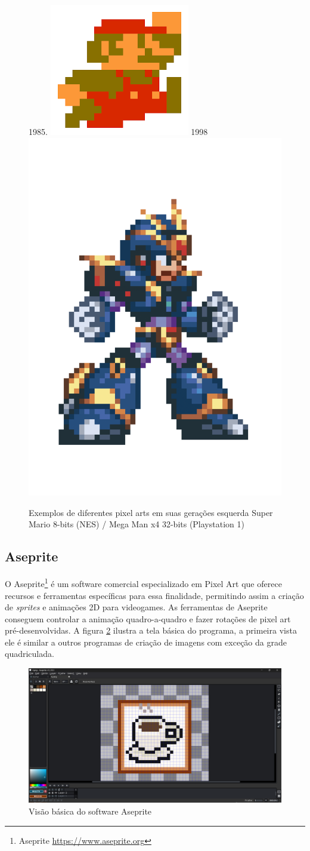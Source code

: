 \begin{figure}[ht!]
    \label{fig:comparative-8bit-32-bit-pixel-art}
    \subfloat\label{fig:mario}1985.{
        \includegraphics[width=0.35\linewidth]{figuras/mario-sprite-nes.png}
    }\hfill
    \subfloat\label{fig:mega_man}1998{
        \includegraphics[width=0.3\linewidth]{figuras/mega-man-ps1.png}
    }
    \caption{Exemplos de diferentes pixel arts em suas gerações esquerda Super Mario 8-bits (NES) /  Mega Man x4 32-bits (Playstation 1)}
\end{figure}

\subsection{Aseprite}  
\label{sec:aseprite}
O Aseprite\footnote{Aseprite \url{https://www.aseprite.org}} é um software comercial especializado em Pixel Art que oferece recursos e ferramentas específicas para essa finalidade, permitindo assim a criação de \textit{sprites} e animações 2D para videogames. As ferramentas de Aseprite conseguem controlar a animação quadro-a-quadro e fazer rotações de pixel art pré-desenvolvidas.
A figura \ref{fig:aseprite} ilustra a tela básica do programa, a primeira vista ele é similar a outros programas de criação de imagens com exceção da grade quadriculada.  
\begin{figure}[ht!]
    \centering
    \includegraphics[width=1\linewidth]{figuras/aseprite.png}
    \caption{Visão básica do software Aseprite}
    \label{fig:aseprite}
\end{figure}

